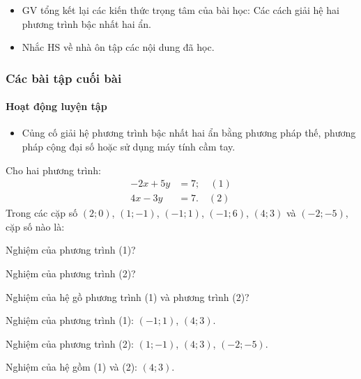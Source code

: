 \begin{itemize}
	\item GV tổng kết lại các kiến thức trọng tâm của bài học: Các cách giải hệ hai phương trình bậc nhất hai ẩn.
	\item Nhắc HS về nhà ôn tập các nội dung đã học.
\end{itemize}

\subsubsection{Các bài tập cuối bài}

\paragraph{Hoạt động luyện tập}

\muctieu

\begin{itemize}
	\item Củng cố giải hệ phương trình bậc nhất hai ẩn bằng phương pháp thế, phương pháp cộng đại số hoặc sử dụng máy tính cầm tay.
\end{itemize}

\noidungsanpham

\begin{baitap}[1.10]
	Cho hai phương trình:
	\begin{align*}
		-2x + 5y &= 7; \quad (1) \\
		4x - 3y &= 7. \quad (2)
	\end{align*}
	Trong các cặp số $(2; 0)$, $(1; -1)$, $(-1; 1)$, $(-1; 6)$, $(4; 3)$ và $(-2; -5)$, cặp số nào là:
	\begin{listEX}
		\item Nghiệm của phương trình (1)?
		\item Nghiệm của phương trình (2)?
		\item Nghiệm của hệ gồ phương trình (1) và phương trình (2)?
	\end{listEX}
	\doicot
	\huongdan
	\begin{listEX}
		\item Nghiệm của phương trình (1): $(-1 ; 1)$, $(4 ; 3)$.
		\item Nghiệm của phương trình (2): $(1 ; -1)$, $(4 ; 3)$, $(- 2; -5)$.
		\item Nghiệm của hệ gồm (1) và (2): $(4 ; 3)$.
	\end{listEX}
\end{baitap}

